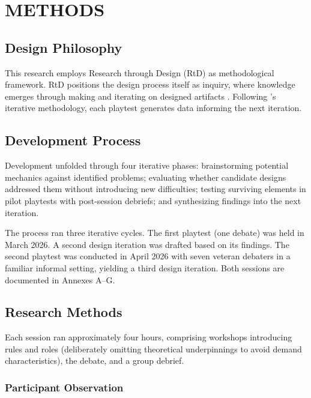 \section{METHODS}
\label{sec:methods}

\subsection{Design Philosophy}

This research employs Research through Design (RtD) as methodological framework. RtD positions the design process itself as inquiry, where knowledge emerges through making and iterating on designed artifacts \parencite{coulton2017games,zimmerman2007research}. Following \textcite{zimmerman2003play}'s iterative methodology, each playtest generates data informing the next iteration.

\subsection{Development Process}

Development unfolded through four iterative phases: brainstorming potential mechanics against identified problems; evaluating whether candidate designs addressed them without introducing new difficulties; testing surviving elements in pilot playtests with post-session debriefs; and synthesizing findings into the next iteration.

The process ran three iterative cycles. The first playtest (one debate) was held in March 2026. A second design iteration was drafted based on its findings. The second playtest was conducted in April 2026 with seven veteran debaters in a familiar informal setting, yielding a third design iteration. Both sessions are documented in Annexes A--G.

\subsection{Research Methods}

Each session ran approximately four hours, comprising workshops introducing rules and roles (deliberately omitting theoretical underpinnings to avoid demand characteristics), the debate, and a group debrief.

\subsubsection{Participant Observation}

